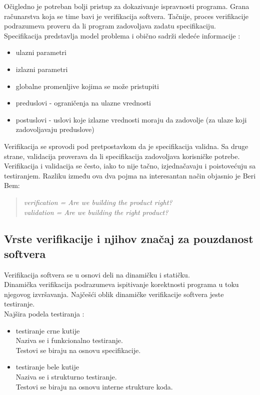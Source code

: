 \documentclass[a4paper]{article}
\begin{document}
Očigledno je potreban bolji pristup za dokazivanje ispravnosti programa. Grana računarstva koja se time bavi je verifikacija softvera.
Tačnije, proces verifikacije podrazumeva proveru da li program zadovoljava zadatu specifikaciju. Specifikacija predstavlja model problema i obično sadrži sledeće informacije \cite{laski2009software}:
\begin{itemize}
\item ulazni parametri
\item izlazni parametri
\item globalne promenljive kojima se može pristupiti
\item preduslovi - ograničenja na ulazne vrednosti
\item postuslovi - uslovi koje izlazne vrednosti moraju da zadovolje (za ulaze koji zadovoljavaju preduslove)
\end{itemize}
Verifikacija se sprovodi pod pretpostavkom da je specifikacija validna. Sa druge strane, validacija proverava da li specifikacija zadovoljava korisničke potrebe. Verifikacija i validacija se često, iako to nije tačno, izjednačavaju i poistovećuju sa testiranjem. Razliku između ova dva pojma na interesantan način objasnio je Beri Bem:
\begin{quote}
\emph{verification = Are we building the product right? \\
validation = Are we building the right product?}
\end{quote}

\subsection{Vrste verifikacije i njihov značaj za pouzdanost softvera}
\label{subsec:verifikacija}
Verifikacija softvera se u osnovi deli na dinamičku i statičku.\\
Dinamička verifikacija podrazumeva ispitivanje korektnosti programa u toku njegovog izvršavanja.
Najčešći oblik dinamičke verifikacije softvera jeste testiranje.\\
Najšira podela testiranja \cite{laski2009software}:
\begin{itemize}
\item testiranje crne kutije\\
Naziva se i funkcionalno testiranje.\\
Testovi se biraju na osnovu specifikacije.
\item testiranje bele kutije\\
Naziva se i strukturno testiranje.\\
Testovi se biraju na osnovu interne strukture koda.
\end{itemize}
\end{document}
